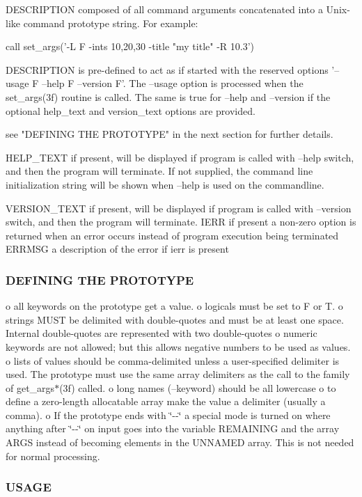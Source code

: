 \begin{DoxyVerb}  DESCRIPTION   composed of all command arguments concatenated
                into a Unix-like command prototype string. For
                example:

                  call set_args('-L F -ints 10,20,30 -title "my title" -R 10.3')

                DESCRIPTION is pre-defined to act as if started with the reserved
                options '--usage F --help F --version F'. The --usage
                option is processed when the set_args(3f)
                routine is called. The same is true for --help and --version
                if the optional help_text and version_text options are
                provided.

                see "DEFINING THE PROTOTYPE" in the next section for further
                details.

  HELP_TEXT     if present, will be displayed if program is called with
                --help switch, and then the program will terminate. If
                not supplied, the command line initialization string will be
                shown when --help is used on the commandline.

  VERSION_TEXT  if present, will be displayed if program is called with
                --version switch, and then the program will terminate.
  IERR          if present a non-zero option is returned when an error occurs
                instead of program execution being terminated
  ERRMSG        a description of the error if ierr is present
\end{DoxyVerb}


\subsubsection*{D\+E\+F\+I\+N\+I\+NG T\+HE P\+R\+O\+T\+O\+T\+Y\+PE}

o all keywords on the prototype get a value. o logicals must be set to F or T. o strings M\+U\+ST be delimited with double-\/quotes and must be at least one space. Internal double-\/quotes are represented with two double-\/quotes o numeric keywords are not allowed; but this allows negative numbers to be used as values. o lists of values should be comma-\/delimited unless a user-\/specified delimiter is used. The prototype must use the same array delimiters as the call to the family of get\+\_\+args$\ast$(3f) called. o long names (--keyword) should be all lowercase o to define a zero-\/length allocatable array make the value a delimiter (usually a comma). o If the prototype ends with \char`\"{}-\/-\/\char`\"{} a special mode is turned on where anything after \char`\"{}-\/-\/\char`\"{} on input goes into the variable R\+E\+M\+A\+I\+N\+I\+NG and the array A\+R\+GS instead of becoming elements in the U\+N\+N\+A\+M\+ED array. This is not needed for normal processing. \subsubsection*{U\+S\+A\+GE}


